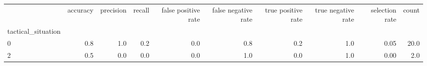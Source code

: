 \begin{tabular}{lrrrrrrrrr}
\toprule
{} &  accuracy &  precision &  recall &  false positive rate &  false negative rate &  true positive rate &  true negative rate &  selection rate &  count \\
tactical\_situation &           &            &         &                      &                      &                     &                     &                 &        \\
\midrule
0                  &       0.8 &        1.0 &     0.2 &                  0.0 &                  0.8 &                 0.2 &                 1.0 &            0.05 &   20.0 \\
2                  &       0.5 &        0.0 &     0.0 &                  0.0 &                  1.0 &                 0.0 &                 1.0 &            0.00 &    2.0 \\
\bottomrule
\end{tabular}
